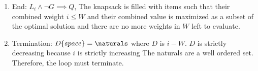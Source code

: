 \documentclass{article}
\begin{document}
\begin{enumerate}
\begin{enumerate}
        \item End: $L_{i} \land \neg G \implies Q$, The knapsack is filled with items such that their combined weight $i \leq W$ and their combined value is maximized as a subset of the optimal solution
 and there are no more weights in $W$ left to evaluate. 

        \item Termination: $D\{space\} = \naturals$ where $D$ is $i - W$. $D$ is strictly decreasing because $i$ is strictly increasing
 The naturals are a well ordered set. Therefore, the loop must terminate. 

    \end{enumerate}

        

\end{enumerate}
\end{document}
